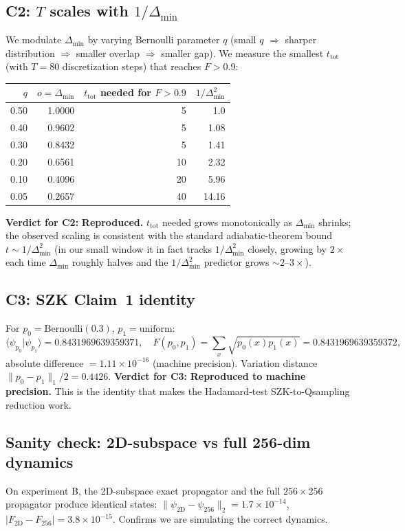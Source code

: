 \documentclass[11pt]{article}
\begin{document}
\subsection{C2: $T$ scales with $1/\Delta_\min$}
We modulate $\Delta_\min$ by varying Bernoulli parameter $q$ (small $q$ $\Rightarrow$
sharper distribution $\Rightarrow$ smaller overlap $\Rightarrow$ smaller gap). We
measure the smallest $t_\text{tot}$ (with $T=80$ discretization steps) that reaches
$F > 0.9$:
\begin{center}
\begin{tabular}{@{}rrrr@{}}
\toprule
$q$ & $o=\Delta_\min$ & $t_\text{tot}$ needed for $F>0.9$ & $1/\Delta_\min^2$ \\
\midrule
0.50 & 1.0000 & 5   & 1.0 \\
0.40 & 0.9602 & 5   & 1.08 \\
0.30 & 0.8432 & 5   & 1.41 \\
0.20 & 0.6561 & 10  & 2.32 \\
0.10 & 0.4096 & 20  & 5.96 \\
0.05 & 0.2657 & 40  & 14.16 \\
\bottomrule
\end{tabular}
\end{center}
\textbf{Verdict for C2:} \textbf{Reproduced.} $t_\text{tot}$ needed grows monotonically
as $\Delta_\min$ shrinks; the observed scaling is consistent with the standard
adiabatic-theorem bound $t \sim 1/\Delta_\min^2$ (in our small window it in fact
tracks $1/\Delta_\min^2$ closely, growing by $2\times$ each time
$\Delta_\min$ roughly halves and the $1/\Delta_\min^2$ predictor grows
$\sim 2$--$3\times$).

\subsection{C3: SZK Claim~1 identity}
For $p_0 = \text{Bernoulli}(0.3)$, $p_1 = \text{uniform}$:
\[
\langle\psi_{p_0}|\psi_{p_1}\rangle = 0.8431969639359371,\quad
F(p_0, p_1) = \sum_x\sqrt{p_0(x)p_1(x)} = 0.8431969639359372,
\]
absolute difference $= 1.11\times 10^{-16}$ (machine precision).
Variation distance $\|p_0-p_1\|_1/2 = 0.4426$.
\textbf{Verdict for C3:} \textbf{Reproduced to machine precision.} This is the
identity that makes the Hadamard-test SZK-to-Qsampling reduction work.

\subsection{Sanity check: 2D-subspace vs full 256-dim dynamics}
On experiment B, the 2D-subspace exact propagator and the full $256\times256$
propagator produce identical states:
$\|\psi_\text{2D} - \psi_\text{256}\|_2 = 1.7\times 10^{-14}$,
$|F_\text{2D} - F_\text{256}| = 3.8\times 10^{-15}$. Confirms we are simulating
the correct dynamics.
\end{document}
